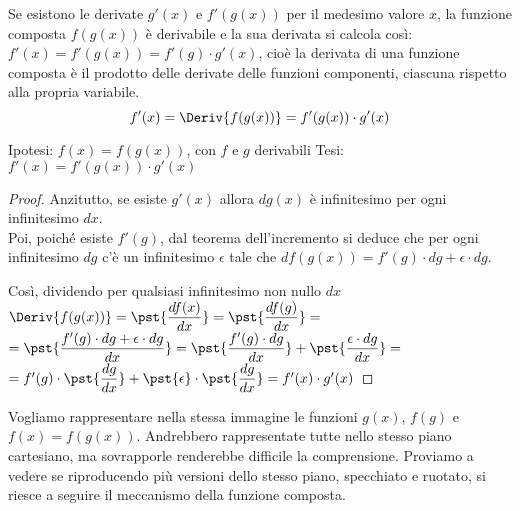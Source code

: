 \begin{teorema}
\label{teo:diff01_dericomp}
Se esistono le derivate \(g'(x)\) e \(f'(g(x))\) per il medesimo valore 
\(x\), la funzione composta \(f(g(x))\) è derivabile e la sua derivata si 
calcola così: \(f'(x)=f'(g(x))=f'(g)\cdot g'(x)\), 
cioè la derivata di una funzione composta è il prodotto delle derivate 
delle funzioni componenti, ciascuna rispetto alla propria variabile.
\[f'(x) = \Deriv{f(g(x))} = f'(g(x)) \cdot g'(x)\]
\end{teorema}
\noindent Ipotesi: \(f(x) = f(g(x))\), con \(f\) e \(g\) derivabili \tab 
Tesi: \(f'(x) = f'(g(x)) \cdot g'(x)\)

\begin{proof}
Anzitutto, se esiste \(g'(x)\) allora \(dg(x)\) è infinitesimo per ogni 
infinitesimo \(dx\).\\
Poi, poiché esiste \(f'(g)\), dal teorema dell'incremento si deduce che per 
ogni infinitesimo \(dg\) c'è un infinitesimo \(\epsilon\) tale che 
\(df(g(x))=f'(g) \cdot dg + \epsilon \cdot dg.\)

Così, dividendo per qualsiasi infinitesimo non nullo \(dx\)\\[.5em]
\hspace*{15mm}
\(\Deriv{f(g(x))} =\pst{\dfrac{df(x)}{dx}} = \pst{\dfrac{df(g)}{dx}}=\)\\[.5em]
\hspace*{32mm}
\(=\pst{\dfrac{f'(g)\cdot dg + \epsilon\cdot dg}{d x}}=
   \pst{\dfrac{f'(g)\cdot dg}{d x}}+ 
   \pst{\dfrac{\epsilon\cdot dg}{dx}}=\)\\[.5em]
\hspace*{32mm}
\(= f'(g)\cdot \pst{\dfrac{dg}{dx}}+ \pst{\epsilon}\cdot\pst{\dfrac{dg}{dx}}=
    f'(x)\cdot g'(x)\)
\end{proof}

Vogliamo rappresentare nella stessa immagine le funzioni 
\(g(x)\), \(f(g)\) e \(f(x) = f(g(x))\).
Andrebbero rappresentate tutte nello stesso piano cartesiano, ma 
sovrapporle renderebbe difficile la comprensione. 
Proviamo a vedere se riproducendo più versioni dello stesso piano, 
specchiato e ruotato, si riesce a seguire il meccanismo della funzione 
composta.

